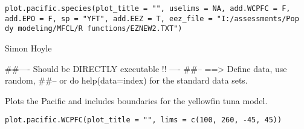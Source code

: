 \documentclass[a4paper]{book}
\begin{document}
%
\begin{Usage}
\begin{verbatim}
plot.pacific.species(plot_title = "", uselims = NA, add.WCPFC = F, add.EPO = F, sp = "YFT", add.EEZ = T, eez_file = "I:/assessments/Pop dy modeling/MFCL/R functions/EZNEW2.TXT")
\end{verbatim}
\end{Usage}
%
\begin{Arguments}
\begin{ldescription}
\item[\code{plot\_title}] 


\item[\code{uselims}] 


\item[\code{add.WCPFC}] 


\item[\code{add.EPO}] 


\item[\code{sp}] 


\item[\code{add.EEZ}] 


\item[\code{eez\_file}] 


\end{ldescription}
\end{Arguments}
%
\begin{Author}\relax

Simon Hoyle
\end{Author}
%
\begin{Examples}
\begin{ExampleCode}
##---- Should be DIRECTLY executable !! ----
##-- ==>  Define data, use random,
##--	or do  help(data=index)  for the standard data sets.

\end{ExampleCode}
\end{Examples}
%
\begin{Description}\relax

Plots the Pacific and includes boundaries for the yellowfin tuna model. 
\end{Description}
%
\begin{Usage}
\begin{verbatim}
plot.pacific.WCPFC(plot_title = "", lims = c(100, 260, -45, 45))
\end{verbatim}
\end{Usage}
\end{document}
